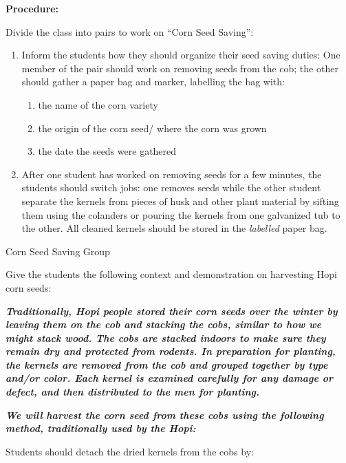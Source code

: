 \documentclass[12pt,]{article}
\providecommand{\tightlist}{%
  \setlength{\itemsep}{0pt}\setlength{\parskip}{0pt}}
\begin{document}
\textbf{Procedure:}

Divide the class into pairs to work on ``Corn Seed Saving'':

\begin{enumerate}
\def\labelenumi{\arabic{enumi}.}
\tightlist
\item
  Inform the students how they should organize their seed saving duties: One member of the pair should work on removing seeds from the cob; the other should gather a paper bag and marker, labelling the bag with:

  \begin{enumerate}
  \def\labelenumii{\arabic{enumii}.}
  \tightlist
  \item
    the name of the corn variety
  \item
    the origin of the corn seed/ where the corn was grown
  \item
    the date the seeds were gathered
  \end{enumerate}
\item
  After one student has worked on removing seeds for a few minutes, the students should switch jobs: one removes seeds while the other student separate the kernels from pieces of husk and other plant material by sifting them using the colanders or pouring the kernels from one galvanized tub to the other. All cleaned kernels should be stored in the \emph{labelled} paper bag.
\end{enumerate}

{Corn Seed Saving Group}

Give the students the following context and demonstration on harvesting Hopi corn seeds:

\textbf{\emph{Traditionally, Hopi people stored their corn seeds over the winter by leaving them on the cob and stacking the cobs, similar to how we might stack wood. The cobs are stacked indoors to make sure they remain dry and protected from rodents. In preparation for planting, the kernels are removed from the cob and grouped together by type and/or color. Each kernel is examined carefully for any damage or defect, and then distributed to the men for planting. }}

\textbf{\emph{We will harvest the corn seed from these cobs using the following method, traditionally used by the Hopi:}}

Students should detach the dried kernels from the cobs by:
\end{document}
